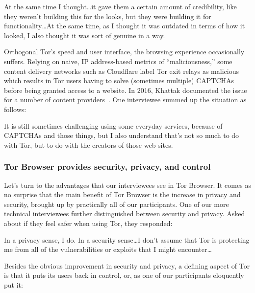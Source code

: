 \begin{displayquote}[P02]
At the same time I thought\ldots it gave them a certain amount of credibility,
like they weren't building this for the looks, but they were building it for
functionality\ldots  At the same time, as I thought it was outdated in terms of
how it looked, I also thought it was sort of genuine in a way.
\end{displayquote}

Orthogonal Tor's speed and user interface, the browsing experience occasionally
suffers.  Relying on naive, IP address-based metrics of ``maliciousness,'' some
content delivery networks such as Cloudflare label Tor exit relays as malicious
which results in Tor users having to solve (sometimes multiple) CAPTCHAs before
being granted access to a website.  In 2016, Khattak \ea documented the issue
for a number of content providers~\cite{Khattak2016a}.  One interviewee summed
up the situation as follows:

\begin{displayquote}[P06]
It is still sometimes challenging using some everyday services, because of
CAPTCHAs and those things, but I also understand that's not so much to do with
Tor, but to do with the creators of those web sites.
\end{displayquote}

\subsubsection{Tor Browser provides security, privacy, and control}

Let's turn to the advantages that our interviewees see in Tor Browser.  It comes
as no surprise that the main benefit of Tor Browser is the increase in privacy
and security, brought up by practically all of our participants.  One of our
more technical interviewees further distinguished between security and privacy.
Asked about if they feel safer when using Tor, they responded:

\begin{displayquote}[P06]
In a privacy sense, I do. In a security sense\ldots I don't assume that Tor is
protecting me from all of the vulnerabilities or exploits that I might
encounter\ldots
\end{displayquote}

Besides the obvious improvement in security and privacy, a defining aspect of
Tor is that it puts its users back in control, or, as one of our participants
eloquently put it:

